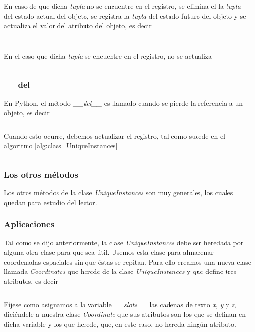 \documentclass{article}
\begin{document}
	En caso de que dicha \emph{tupla} no se encuentre en el registro, se elimina el la \emph{tupla} del estado actual del objeto, se registra la \emph{tupla} del estado futuro del objeto y se actualiza el valor del atributo del objeto, es decir
	\inputminted[firstline=28, lastline=30, breaklines]{python}{collection_class.py}
	\inputminted[firstline=39, lastline=39, breaklines]{python}{collection_class.py}

	En el caso que dicha \emph{tupla} se encuentre en el registro, no se actualiza
	\inputminted[firstline=32, lastline=37, breaklines]{python}{collection_class.py}

	\subsubsection{\_\_del\_\_}

	En Python, el método \emph{\_\_del\_\_} es llamado cuando se pierde la referencia a un objeto, es decir
	\inputminted[firstline=63, lastline=68, breaklines]{python}{dumpy.py}

	Cuando esto ocurre, debemos actualizar el registro, tal como sucede en el algoritmo \ref{alg:class_UniqueInstances}

	\inputminted[firstline=48, lastline=49, breaklines]{python}{collection_class.py}

	\subsubsection{Los otros métodos}
	Los otros métodos de la clase \emph{UniqueInstances} son muy generales, los cuales quedan para estudio del lector.

	\subsubsection{Aplicaciones}
	Tal como se dijo anteriormente, la clase \emph{UniqueInstances} debe ser heredada por alguna otra clase para que sea útil. Usemos esta clase para almacenar coordenadas espaciales sin que éstas se repitan. Para ello creamos una nueva clase llamada \emph{Coordinates} que herede de la clase \emph{UniqueInstances} y que define tres atributos, es decir
	\inputminted[firstline=51, lastline=55, breaklines]{python}{collection_class.py}

	Fíjese como asignamos a la variable \emph{\_\_slots\_\_} las cadenas de texto \emph{x}, \emph{y} y \emph{z}, diciéndole a nuestra clase \emph{Coordinate} que sus atributos son los que se definan en dicha variable y los que herede, que, en este caso, no hereda ningún atributo.
\end{document}
